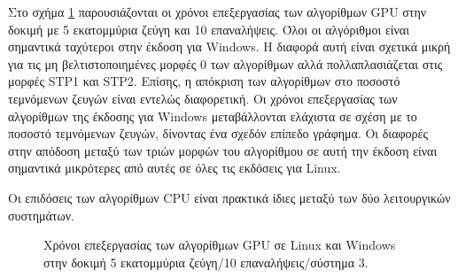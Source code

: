 Στο σχήμα \ref{gpuoscomp} παρουσιάζονται οι χρόνοι επεξεργασίας των αλγορίθμων GPU στην δοκιμή με 5 εκατομμύρια ζεύγη και 10 επαναλήψεις. Όλοι οι αλγόριθμοι είναι σημαντικά ταχύτεροι στην έκδοση για Windows. Η διαφορά αυτή είναι σχετικά μικρή για τις μη βελτιστοποιημένες μορφές 0 των αλγορίθμων αλλά πολλαπλασιάζεται στις μορφές STP1 και STP2. Επίσης, η απόκριση των αλγορίθμων στο ποσοστό τεμνόμενων ζευγών είναι εντελώς διαφορετική. Οι χρόνοι επεξεργασίας των αλγορίθμων της έκδοσης για Windows μεταβάλλονται ελάχιστα σε σχέση με το ποσοστό τεμνόμενων ζευγών, δίνοντας ένα σχεδόν επίπεδο γράφημα. Οι διαφορές στην απόδοση μεταξύ των τριών μορφών του αλγορίθμου σε αυτή την έκδοση είναι σημαντικά μικρότερες από αυτές σε όλες τις εκδόσεις για Linux.

Οι επιδόσεις των αλγορίθμων CPU είναι πρακτικά ίδιες μεταξύ των δύο λειτουργικών συστημάτων. 

\begin{figure}[b]
\begin{center}
\scalebox{1.05}
{

}
\end{center}
\caption{Χρόνοι επεξεργασίας των αλγορίθμων GPU σε Linux και Windows στην δοκιμή 5 εκατομμύρια ζεύγη/10 επαναλήψεις/σύστημα 3.}
\label{gpuoscomp}
\end{figure}

\UndefineShortVerb{\!}